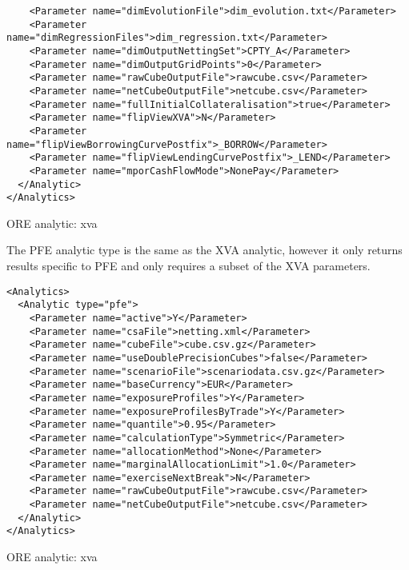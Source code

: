 {\begin{listing}[H]
\begin{verbatim}
    <Parameter name="dimEvolutionFile">dim_evolution.txt</Parameter>
    <Parameter name="dimRegressionFiles">dim_regression.txt</Parameter>
    <Parameter name="dimOutputNettingSet">CPTY_A</Parameter>      
    <Parameter name="dimOutputGridPoints">0</Parameter>
    <Parameter name="rawCubeOutputFile">rawcube.csv</Parameter>
    <Parameter name="netCubeOutputFile">netcube.csv</Parameter>
    <Parameter name="fullInitialCollateralisation">true</Parameter>
    <Parameter name="flipViewXVA">N</Parameter>
    <Parameter name="flipViewBorrowingCurvePostfix">_BORROW</Parameter>
    <Parameter name="flipViewLendingCurvePostfix">_LEND</Parameter>
    <Parameter name="mporCashFlowMode">NonePay</Parameter>
  </Analytic>
</Analytics>
\end{verbatim}
\caption{ORE analytic: xva}
\label{lst:ore_xva}
\end{listing}

The PFE analytic type is the same as the XVA analytic, however it only returns results specific to PFE and only requires a subset of the XVA parameters.

\begin{listing}[H]
\begin{verbatim}
<Analytics>
  <Analytic type="pfe">
    <Parameter name="active">Y</Parameter>
    <Parameter name="csaFile">netting.xml</Parameter>
    <Parameter name="cubeFile">cube.csv.gz</Parameter>
    <Parameter name="useDoublePrecisionCubes">false</Parameter>
    <Parameter name="scenarioFile">scenariodata.csv.gz</Parameter>
    <Parameter name="baseCurrency">EUR</Parameter>
    <Parameter name="exposureProfiles">Y</Parameter>
    <Parameter name="exposureProfilesByTrade">Y</Parameter>
    <Parameter name="quantile">0.95</Parameter>
    <Parameter name="calculationType">Symmetric</Parameter>
    <Parameter name="allocationMethod">None</Parameter>
    <Parameter name="marginalAllocationLimit">1.0</Parameter>
    <Parameter name="exerciseNextBreak">N</Parameter>
    <Parameter name="rawCubeOutputFile">rawcube.csv</Parameter>
    <Parameter name="netCubeOutputFile">netcube.csv</Parameter>
  </Analytic>
</Analytics>
\end{verbatim}
\caption{ORE analytic: xva}
\label{lst:ore_xva}
\end{listing}

}
